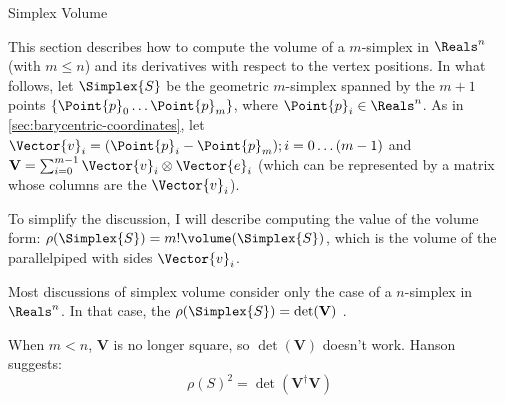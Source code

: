 \begin{plSection}{Simplex Volume}
\label{sec:simplex_volume}

\nocite{Heckbert:1974:GraphicsGems4}
\nocite{GoodmanORourke:2004:HDCG2}

This section describes how to compute
the volume of a $m$-simplex in $\Reals^n$ (with $m \le n$)
and its derivatives with respect to the vertex positions.
In what follows, let $\Simplex{S}$ be the geometric $m$-simplex
spanned by the $m+1$ points $\left\{\Point{p}_0  \ldots  \Point{p}_m\right\}$,
where $\Point{p}_i \in \Reals^n$.
As in \cref{sec:barycentric-coordinates},
let $\Vector{v}_i = (\Point{p}_i - \Point{p}_m); i = 0 \ldots (m-1)$
and ${\mathbf V} = \sum_{i=0}^{m-1} \Vector{v}_i \otimes \Vector{e}_i$
(which can be represented by a matrix whose columns are the $\Vector{v}_i$).

To simplify the discussion, I will describe computing the
value of the volume form: 
$\rho(\Simplex{S}) = m! \volume(\Simplex{S})$,
which is the volume of the parallelpiped with sides $\Vector{v}_i$.

Most discussions of simplex volume consider
only the case of a $n$-simplex in $\Reals^n$.
In that case, the $\rho(\Simplex{S}) = \det({\mathbf V)}$
\cite{HenkRichterGebertZiegler:2004:ConvexPolytopes}.

When $m < n$, ${\mathbf V}$ is no longer square,
so $\det({\mathbf V})$ doesn't work.
Hanson \cite{Hanson:1994:NdGraphics} suggests:
\begin{equation}
\rho(S)^2 = \det({\mathbf V}^{\dagger} {\mathbf V})
\end{equation}

\end{plSection}%
